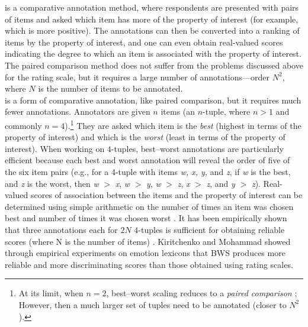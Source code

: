 \documentclass[11pt]{article}
\begin{document}
 \cite{thurstone1927law,david1963method} is a comparative annotation method, 
where respondents are presented with pairs of items and asked which item has more of the property of interest (for example, which is more positive). The annotations can then be converted into a ranking of items by the property of interest, and one can even obtain real-valued scores indicating the degree to which an item is associated with the property of interest.
The paired comparison method does not suffer from the problems discussed above for the rating scale, but it requires a large number of annotations---order $N^2$, where $N$ is the number of items to be annotated.\\[-10pt]

 \cite{Louviere_1991} is a form of comparative annotation, like paired comparison, but it requires much fewer annotations.
Annotators are given $n$ items (an $n$-tuple, where $n > 1$ and commonly $n= 4$).\footnote{At its limit, when $n=2$, best--worst scaling reduces to a {\it paired comparison} \cite{thurstone1927law,david1963method}; However, then a much larger set of tuples need to be annotated (closer to $N^2$). } 
They are asked which item is the {\it best} (highest in terms of the property of interest) and which is the {\it worst} (least in terms of the property of interest).
When working on $4$-tuples, best--worst annotations are particularly efficient because each best and worst annotation will reveal the order of
five of the six item pairs (e.g., for a 4-tuple with items \textit{w, x, y,} and \textit{z}, if \textit{w} is the best, and \textit{z} is the worst, then \textit{w} $>$ \textit{x}, \textit{w} $>$ \textit{y}, \textit{w} $>$ \textit{z}, \textit{x} $>$ \textit{z}, and \textit{y} $>$ \textit{z}).
Real-valued scores of association 
between the items and the property of interest can be determined using simple arithmetic on the number of times an item was chosen best and number of times it was chosen worst  
\cite{Orme_2009,flynn2014}.
It has been empirically shown that three annotations each for $2N$ $4$-tuples is sufficient for obtaining reliable scores (where N is the number of items) \cite{Louviere_1991,maxdiff-naacl2016}.
Kiritchenko and Mohammad  showed through empirical experiments on emotion lexicons that BWS produces more reliable and more discriminating scores than those obtained using rating scales. 
\end{document}
